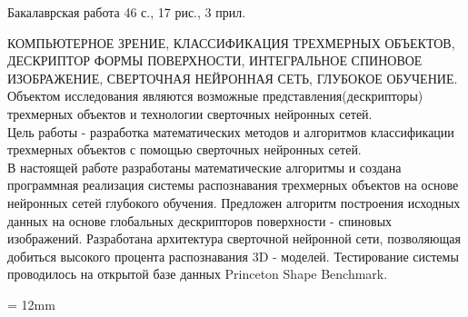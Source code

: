 \documentclass[14pt]{article}
\numberwithin{figure}{section}
\numberwithin{equation}{section}
\begin{document}
\begin{flushleft}
Бакалаврская работа 46 с., 17 рис., 3 прил.                                       \\
\vspace{0.5cm}

КОМПЬЮТЕРНОЕ ЗРЕНИЕ, КЛАССИФИКАЦИЯ ТРЕХМЕРНЫХ ОБЪЕКТОВ, ДЕСКРИПТОР ФОРМЫ ПОВЕРХНОСТИ, ИНТЕГРАЛЬНОЕ СПИНОВОЕ ИЗОБРАЖЕНИЕ, СВЕРТОЧНАЯ НЕЙРОННАЯ СЕТЬ, ГЛУБОКОЕ ОБУЧЕНИЕ.                     \\

\vspace{0.5cm}
Объектом исследования являются возможные представления(дескрипторы) трехмерных объектов и технологии сверточных нейронных сетей.                                            \\
\vspace{0.5cm}
Цель работы - разработка математических методов и алгоритмов классификации трехмерных объектов с помощью сверточных нейронных сетей.                                     \\
\vspace{0.5cm}
В настоящей работе разработаны математические алгоритмы и создана программная реализация системы распознавания трехмерных объектов на основе нейронных сетей глубокого обучения. Предложен алгоритм построения исходных данных на основе глобальных дескрипторов поверхности - спиновых изображений. Разработана архитектура сверточной нейронной сети, позволяющая добиться высокого процента распознавания 3D - моделей. Тестирование системы проводилось на открытой базе данных Princeton Shape Benchmark.
%
\end{flushleft}

{}
\parindent = 12mm
\end{document}
